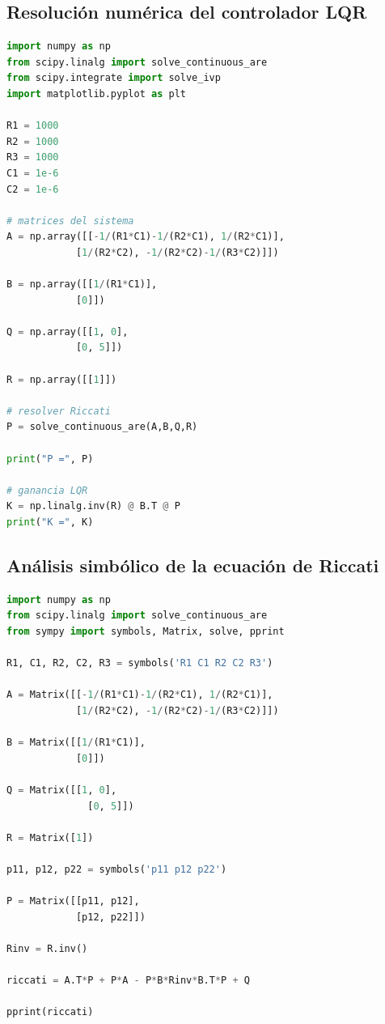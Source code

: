 \documentclass[12pt,letterpaper,twoside]{article}
\begin{document}
\subsection{Resolución numérica del controlador LQR}
\label{sec:SolveLQR}

\begin{lstlisting}[language=Python]
import numpy as np
from scipy.linalg import solve_continuous_are
from scipy.integrate import solve_ivp
import matplotlib.pyplot as plt

R1 = 1000
R2 = 1000
R3 = 1000
C1 = 1e-6
C2 = 1e-6

# matrices del sistema
A = np.array([[-1/(R1*C1)-1/(R2*C1), 1/(R2*C1)],
            [1/(R2*C2), -1/(R2*C2)-1/(R3*C2)]])

B = np.array([[1/(R1*C1)],
            [0]])

Q = np.array([[1, 0],
            [0, 5]])

R = np.array([[1]])

# resolver Riccati
P = solve_continuous_are(A,B,Q,R)

print("P =", P)

# ganancia LQR
K = np.linalg.inv(R) @ B.T @ P
print("K =", K)
\end{lstlisting}

\subsection{Análisis simbólico de la ecuación de Riccati}

\begin{lstlisting}[language=Python]
import numpy as np
from scipy.linalg import solve_continuous_are
from sympy import symbols, Matrix, solve, pprint

R1, C1, R2, C2, R3 = symbols('R1 C1 R2 C2 R3')

A = Matrix([[-1/(R1*C1)-1/(R2*C1), 1/(R2*C1)],
            [1/(R2*C2), -1/(R2*C2)-1/(R3*C2)]])

B = Matrix([[1/(R1*C1)],
            [0]])
            
Q = Matrix([[1, 0],
              [0, 5]])
              
R = Matrix([1])

p11, p12, p22 = symbols('p11 p12 p22')

P = Matrix([[p11, p12],
            [p12, p22]])

Rinv = R.inv()

riccati = A.T*P + P*A - P*B*Rinv*B.T*P + Q

pprint(riccati)
\end{lstlisting}
\end{document}
